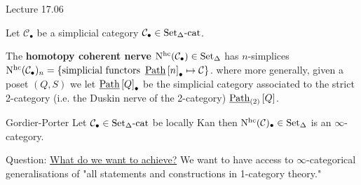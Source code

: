 
Lecture 17.06

Let $\mathcal{ C }_\bullet $ be a simplicial category $ \mathcal{ C }_\bullet \in \operatorname{Set_{ \Delta }-cat} $.

\begin{defi}
	The \textbf{homotopy coherent nerve} $ \operatorname{N^{hc}} ( \mathcal{ C }_{ \bullet } ) \in \operatorname{Set}_{\Delta} $ has $ n $-simplices $ \operatorname{N^{hc}} ( \mathcal{ C }_{ \bullet } )_n = \{ \text{simplicial functors } \operatorname{\underline{Path}} \left[ n  \right]_{ \bullet } \mapsto \mathcal{ C } \} $.
	where more generally, given a poset $ ( Q , S ) $ we let $ \operatorname{\underline{Path}} \left[ Q \right]_{ \bullet } $ be the simplicial category associated to the strict 2-category (i.e. the Duskin nerve of the 2-category) $ \operatorname{\underline{Path}}_{ ( 2 ) } \left[ Q \right] $.
\end{defi} 

\begin{thm}{Gordier-Porter}
	Let $ \mathcal{ C }_\bullet \in \operatorname{Set_{ \Delta }-cat} $ be locally Kan then $ \operatorname{N^{hc}} ( \mathcal{ C } )_\bullet \in \operatorname{Set}_\Delta $ is an $ \infty $-category.
\end{thm}

Question: \underline{What do we want to achieve?}
We want to have access to $ \infty $-categorical generalisations of "all statements and constructions in 1-category theory."

